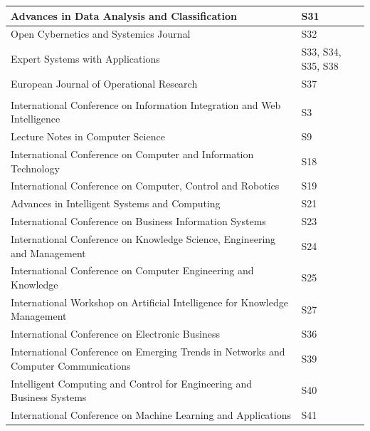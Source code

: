 \begin{table}[htbp]
{\begin{tabular}{|
  >{\raggedright\arraybackslash}m{12.5cm}
  |>{\centering\arraybackslash}m{2cm}|}
Advances in Data Analysis and Classification & S31 \\ \hline
Open Cybernetics and Systemics Journal & S32 \\ \hline
Expert Systems with Applications & S33, S34, S35, S38 \\ \hline
European Journal of Operational Research & S37 \\ \hline
\rowcolor{lightgray} 
\multicolumn{2}{|c|}{\textbf{Conferences}} \\ \hline
International Conference on Information Integration and Web Intelligence & S3 \\ \hline
Lecture Notes in Computer Science & S9 \\ \hline
International Conference on Computer and Information Technology & S18 \\ \hline
International Conference on Computer, Control and Robotics & S19 \\ \hline
Advances in Intelligent Systems and Computing & S21 \\ \hline
International Conference on Business Information Systems & S23 \\ \hline
International Conference on Knowledge Science, Engineering and Management & S24 \\ \hline
International Conference on Computer Engineering and Knowledge & S25 \\ \hline
International Workshop on Artificial Intelligence for Knowledge Management & S27 \\ \hline
International Conference on Electronic Business & S36 \\ \hline
International Conference on Emerging Trends in Networks and Computer Communications & S39 \\ \hline
Intelligent Computing and Control for Engineering and Business Systems & S40 \\ \hline
International Conference on Machine Learning and Applications & S41 \\ \hline
\end{tabular}
}
\end{table}